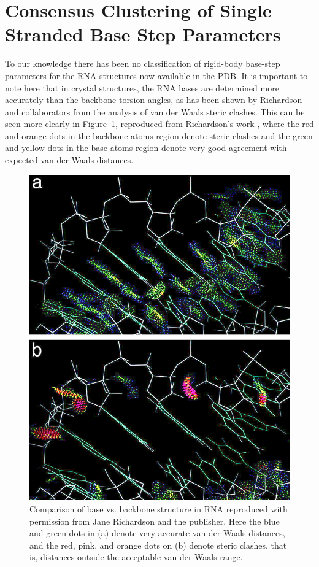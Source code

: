 \section{Consensus Clustering of Single Stranded Base Step Parameters}
To  our  knowledge there  has  been  no  classification of  rigid-body
base-step parameters for the RNA  structures now available in the PDB.
It is important to note here that in crystal structures, the RNA bases
are determined  more accurately than  the backbone torsion  angles, as
has been  shown by Richardson  and collaborators from the  analysis of
van  der Waals  steric  clashes.  This  can  be seen  more clearly  in
Figure~\ref{fig:murray},    reproduced    from    Richardson's    work
\cite{murray2003}, where the red and orange dots in the backbone atoms
region denote steric clashes and the green and yellow dots in the base
atoms region  denote very good  agreement with expected van  der Waals
distances.
\begin{figure}[htbp]
 \centering
 \includegraphics[scale=0.4]{Chapter2/murray2003.png}
 \caption{Comparison of base vs.  backbone structure in RNA reproduced
   with  permission  from Jane  Richardson  \cite{murray2003} and  the
   publisher. Here the blue and green dots in (a) denote very accurate
   van der Waals distances, and the  red, pink, and orange dots on (b)
   denote steric  clashes, that  is, distances outside  the acceptable
   van der Waals range.}
 \label{fig:murray}
\end{figure}

